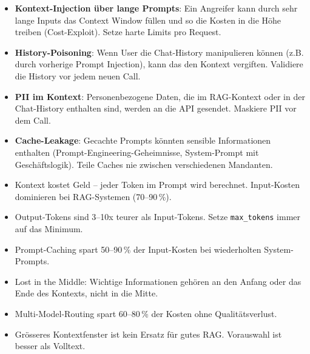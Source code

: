 \begin{itemize}[leftmargin=*]
    \item \textbf{Kontext-Injection über lange Prompts}: Ein Angreifer
    kann durch sehr lange Inputs das Context Window füllen und so
    die Kosten in die Höhe treiben (Cost-Exploit). Setze harte
    Limits pro Request.
    \item \textbf{History-Poisoning}: Wenn User die Chat-History
    manipulieren können (z.B. durch vorherige Prompt Injection),
    kann das den Kontext vergiften. Validiere die History vor
    jedem neuen Call.
    \item \textbf{PII im Kontext}: Personenbezogene Daten, die im
    RAG-Kontext oder in der Chat-History enthalten sind, werden
    an die API gesendet. Maskiere PII vor dem Call.
    \item \textbf{Cache-Leakage}: Gecachte Prompts könnten sensible
    Informationen enthalten (Prompt-Engineering-Geheimnisse,
    System-Prompt mit Geschäftslogik). Teile Caches nie zwischen
    verschiedenen Mandanten.
\end{itemize}

\begin{zusammenfassung}
\begin{itemize}[leftmargin=*]
    \item Kontext kostet Geld -- jeder Token im Prompt wird berechnet.
    Input-Kosten dominieren bei RAG-Systemen (70--90\,\%).
    \item Output-Tokens sind 3--10x teurer als Input-Tokens.
    Setze \texttt{max\_tokens} immer auf das Minimum.
    \item Prompt-Caching spart 50--90\,\% der Input-Kosten bei
    wiederholten System-Prompts.
    \item Lost in the Middle: Wichtige Informationen gehören an den
    Anfang oder das Ende des Kontexts, nicht in die Mitte.
    \item Multi-Model-Routing spart 60--80\,\% der Kosten ohne
    Qualitätsverlust.
    \item Grösseres Kontextfenster ist kein Ersatz für gutes RAG.
    Vorauswahl ist besser als Volltext.
\end{itemize}
\end{zusammenfassung}

